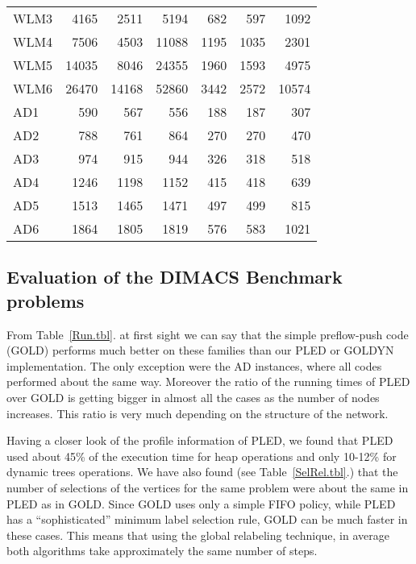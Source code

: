 \begin{table}[h]
\begin{center}
\begin{tabular}{||l||r|r|r||r|r|r||}
WLM3 &   4165 &   2511 &   5194 &    682 &   597 &   1092\\
WLM4 &   7506 &   4503 &  11088 &   1195 &  1035 &   2301\\
WLM5 &  14035 &   8046 &  24355 &   1960 &  1593 &   4975\\
WLM6 &  26470 &  14168 &  52860 &   3442 &  2572 &  10574\\
\hline
 AD1 &   590 &   567 &   556 &    188 &   187 &   307\\
 AD2 &   788 &   761 &   864 &    270 &   270 &   470\\
 AD3 &   974 &   915 &   944 &    326 &   318 &   518\\
 AD4 &   1246 &   1198 &   1152 &    415 &   418 &   639\\
 AD5 &   1513 &   1465 &   1471 &    497 &   499 &   815\\
 AD6 &   1864 &  1805 &	1819 & 576 & 583 & 1021 \\
\hline
\end{tabular}\end{center}
\end{table}

\subsection{Evaluation of the DIMACS Benchmark problems}
From Table~\ref{Run.tbl}. at first sight we can say that the simple
preflow-push code (GOLD) 
performs much better on these families than our PLED or GOLDYN
implementation. 
The only exception were the AD instances, where all codes performed
about the same way. Moreover the ratio of the running times of PLED
over GOLD is getting bigger in almost all the cases as the number of
nodes increases.  This ratio is very much depending on the structure
of the network.

Having a closer look of the profile information of PLED, we found that
PLED used about 45\% 
of the execution time for heap operations and only 10-12\% for
dynamic trees operations. We have also found (see
Table~\ref{SelRel.tbl}.) 
that the number of selections of the vertices for the same problem were
about the same in PLED as in GOLD. Since GOLD uses
only a simple FIFO policy, while PLED has a ``sophisticated'' minimum
label selection rule, GOLD can be much faster in these cases. This
means that using the global 
relabeling technique, in average both algorithms take
approximately the same number of steps.


